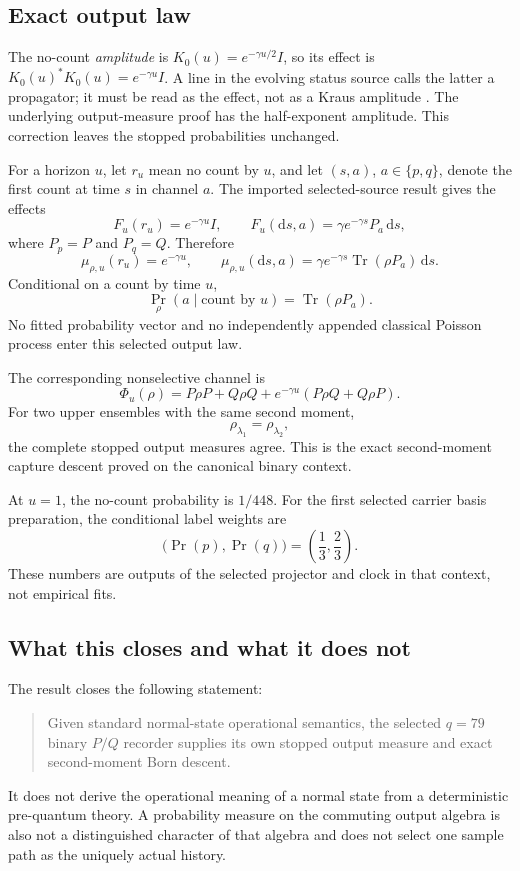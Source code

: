 \documentclass[11pt]{article}
\theoremstyle{definition}
\theoremstyle{remark}
\newcommand{\dd}{\mathrm d}
\newcommand{\Tr}{\operatorname{Tr}}
\begin{document}
\subsection{Exact output law}

The no-count \emph{amplitude} is \(K_0(u)=e^{-\gamma u/2}I\), so its
effect is \(K_0(u)^*K_0(u)=e^{-\gamma u}I\). A line in the evolving status
source calls the latter a propagator; it must be read as the effect, not
as a Kraus amplitude \cite{FrozenQMStatus}. The underlying output-measure
proof has the half-exponent amplitude. This correction leaves the stopped
probabilities unchanged.
\label{sec:no-count-correction}

For a horizon \(u\), let \(r_u\) mean no count by \(u\), and let
\((s,a)\), \(a\in\{p,q\}\), denote the first count at time \(s\) in channel
\(a\).  The imported selected-source result gives the effects
\[
F_u(r_u)=e^{-\gamma u}I,
\qquad
F_u(\dd s,a)
=\gamma e^{-\gamma s}P_a\,\dd s,
\]
where \(P_p=P\) and \(P_q=Q\).  Therefore
\[
\mu_{\rho,u}(r_u)=e^{-\gamma u},
\qquad
\mu_{\rho,u}(\dd s,a)
=\gamma e^{-\gamma s}\Tr(\rho P_a)\,\dd s.
\]
Conditional on a count by time \(u\),
\[
\Pr_\rho(a\mid\text{count by }u)
=\Tr(\rho P_a).
\]
No fitted probability vector and no independently appended classical
Poisson process enter this selected output law.

The corresponding nonselective channel is
\[
\Phi_u(\rho)
=P\rho P+Q\rho Q
+e^{-\gamma u}(P\rho Q+Q\rho P).
\]
For two upper ensembles with the same second moment,
\[
\rho_{\lambda_1}=\rho_{\lambda_2},
\]
the complete stopped output measures agree.  This is the exact
second-moment capture descent proved on the canonical binary context.

At \(u=1\), the no-count probability is \(1/448\).  For the first selected
carrier basis preparation, the conditional label weights are
\[
\bigl(\Pr(p),\Pr(q)\bigr)
=\left(\frac13,\frac23\right).
\]
These numbers are outputs of the selected projector and clock in that
context, not empirical fits.

\subsection{What this closes and what it does not}

The result closes the following statement:
\begin{quote}
Given standard normal-state operational semantics, the selected \(q=79\)
binary \(P/Q\) recorder supplies its own stopped output measure and exact
second-moment Born descent.
\end{quote}
It does not derive the operational meaning of a normal state from a
deterministic pre-quantum theory.  A probability measure on the commuting
output algebra is also not a distinguished character of that algebra and
does not select one sample path as the uniquely actual history.
\end{document}
